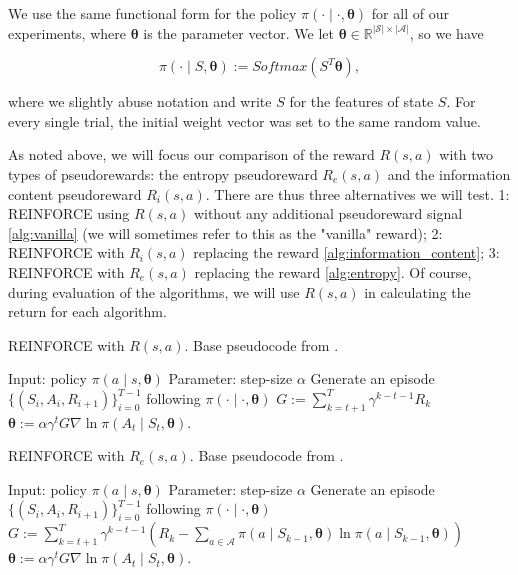 \documentclass{article}
\begin{document}
  We use the same functional form for the policy $\pi(\cdot \mid \cdot, \bm{\theta})$ for all of our experiments, where $\bm{\theta}$ is the parameter vector. We let $\bm{\theta} \in \mathbb{R}^{|\mathcal{S}| \times |\mathcal{A}|}$, so we have

  \begin{equation*}
    \pi(\cdot \mid S, \bm{\theta}) :=  Softmax(S^T \bm{\theta}),
  \end{equation*}

  where we slightly abuse notation and write $S$ for the features of state $S$. For every single trial, the initial weight vector was set to the same random value.

  As noted above, we will focus our comparison of the reward $R(s, a)$ with two types of pseudorewards: the entropy pseudoreward $R_e(s, a)$ and the information content pseudoreward $R_i(s, a)$. There are thus three alternatives we will test. 1: REINFORCE using $R(s, a)$ without any additional pseudoreward signal \cref{alg:vanilla} (we will sometimes refer to this as the "vanilla" reward); 2: REINFORCE with $R_i(s, a)$ replacing the reward \cref{alg:information_content}; 3: REINFORCE with $R_e(s, a)$ replacing the reward \cref{alg:entropy}. Of course, during evaluation of the algorithms, we will use $R(s, a)$ in calculating the return for each algorithm.

  \begin{algorithm}
    \caption{REINFORCE with $R(s, a)$. Base pseudocode from \citet[p.328]{sutton2018reinforcement}.}
    \label{alg:vanilla}
    \begin{algorithmic}
      \State Input: policy $\pi(a \mid s, \bm{\theta})$
      \State Parameter: step-size $\alpha$
        \State Generate an episode $\{(S_i, A_i, R_{i + 1})\}_{i = 0}^{T - 1}$ following $\pi(\cdot \mid \cdot, \bm{\theta})$
          \State $G := \sum_{k = t + 1}^T \gamma^{k - t - 1} R_k$
          \State $\bm{\theta} := \alpha \gamma^t G \nabla \ln \pi(A_t \mid S_t, \bm{\theta})$.
        \EndFor
      \EndFor
    \end{algorithmic}
  \end{algorithm}

  \begin{algorithm}
    \caption{REINFORCE with $R_e(s, a)$. Base pseudocode from \citet[p.328]{sutton2018reinforcement}.}
    \label{alg:entropy}
    \begin{algorithmic}
      \State Input: policy $\pi(a \mid s, \bm{\theta})$
      \State Parameter: step-size $\alpha$
        \State Generate an episode $\{(S_i, A_i, R_{i + 1})\}_{i = 0}^{T - 1}$ following $\pi(\cdot \mid \cdot, \bm{\theta})$
          \State $G := \sum_{k = t + 1}^T \gamma^{k - t - 1} (R_k - \sum_{a \in \mathcal{A}} \pi(a \mid S_{k - 1}, \bm{\theta}) \ln \pi(a \mid S_{k - 1}, \bm{\theta}))$
          \State $\bm{\theta} := \alpha \gamma^t G \nabla \ln \pi(A_t \mid S_t, \bm{\theta})$.
        \EndFor
      \EndFor
    \end{algorithmic}
  \end{algorithm}
\end{document}

